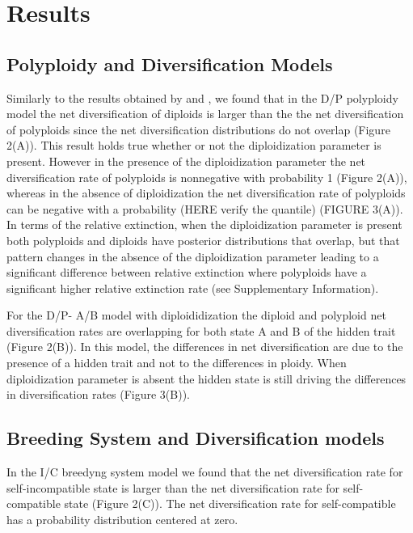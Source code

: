 \section{Results}

 
\subsection{Polyploidy and Diversification Models}
Similarly to the results obtained by \citet{mayrose_2011} and \citet{mayrose_2015}, we found that in the D/P polyploidy model the net diversification of diploids is larger than the the net diversification of polyploids since the net diversification distributions do not overlap (Figure 2(A)). This result holds true whether or not the diploidization parameter is present. However in the presence of  the diploidization parameter the net diversification rate of polyploids is nonnegative with probability 1 (Figure 2(A)), whereas in the absence of diploidization the net diversification rate of polyploids can be negative with a probability (HERE verify the quantile) (FIGURE 3(A)). In terms of the relative extinction, when the diploidization parameter is present both polyploids and diploids have posterior distributions that overlap, but that pattern changes in the absence of the diploidization parameter leading to a significant difference between relative extinction where polyploids have a significant higher relative extinction rate (see Supplementary Information).\newline

For the D/P- A/B model with diploididization the diploid and polyploid net diversification rates are overlapping for both state A and B of the hidden trait (Figure 2(B)). In this model, the differences in net diversification are due to the presence of a hidden trait and not to the differences in ploidy. When diploidization parameter is absent the hidden state is still driving the differences in diversification rates (Figure 3(B)).

\subsection{Breeding System and Diversification models }
In the I/C breedyng system model we found that the net diversification rate for self-incompatible state is larger than the net diversification rate for self-compatible state (Figure 2(C)). The net diversification rate for self-compatible has a probability distribution centered at zero.  \newline

